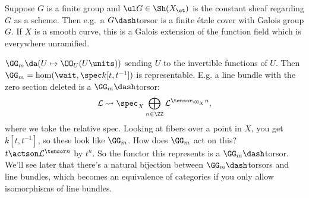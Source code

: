 \begin{example}[?]

Suppose \(G\) is a finite group and \(\ul G \in \Sh(X_\et)\) is the
constant sheaf regarding \(G\) as a scheme. Then e.g.~a \(G\dash\)torsor
is a finite étale cover with Galois group \(G\). If \(X\) is a smooth
curve, this is a Galois extension of the function field which is
everywhere unramified.

\end{example}

\begin{example}[?]

\(\GG_m \da (U\mapsto \OO_U(U\units))\) sending \(U\) to the invertible
functions of \(U\). Then \(\GG_m = \hom(\wait, \spec k[t, t^{-1}])\) is
representable. E.g. a line bundle with the zero section deleted is a
\(\GG_m\dash\)torsor:
\begin{align*}  
\mathcal{L} \leadsto \spec_X \bigoplus_{n\in \ZZ} \mathcal{L}^{\tensor_{\OO_X} n}
,\end{align*} where we take the relative spec. Looking at fibers over a
point in \(X\), you get \(k[t, t^{-1}]\), so these look like \(\GG_m\).
How does \(\GG_m\) act on this? \(t\actson \mathcal{L}^{\tensor n}\) by
\(t^n\). So the functor this represents is a \(\GG_m\dash\)torsor. We'll
see later that there's a natural bijection between \(\GG_m\dash\)torsors
and line bundles, which becomes an equivalence of categories if you only
allow isomorphisms of line bundles.

\end{example}

